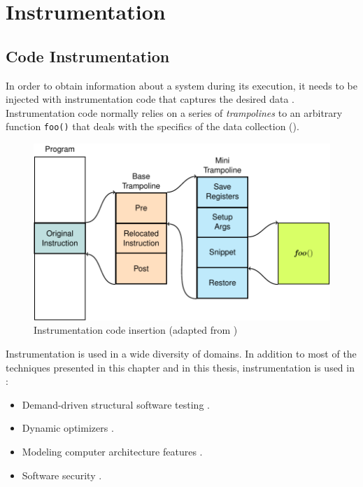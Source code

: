 \section{Instrumentation}
\subsection*{Code Instrumentation}
In order to obtain information about a system during its execution, it
needs to be injected with instrumentation code that captures the
desired data \citep{Garlan95}.
%
Instrumentation code normally relies on a series of \emph{trampolines}
to an arbitrary function \texttt{foo()} that deals with the specifics
of the data collection
().
%


\begin{figure}[ht]
  \includegraphics[width=0.9\columnwidth,page=1]{figures/related_work/figures/main.pdf}
  \caption{Instrumentation code insertion (adapted from \citep{Tikir02})}
  \label{fig:related-work:instrumentation-program}
\end{figure}


Instrumentation is used in a wide diversity of domains.
%
In addition to most of the techniques presented in this chapter and in
this thesis, instrumentation is used in \citep{Kumar05}:
\begin{itemize}[nolistsep]
\item Demand-driven structural software testing \citep{Misurda05}.
\item Dynamic optimizers \citep{Arnold01,Hong15,Bala00}.
\item Modeling computer architecture features \citep{Cmelik95,Scott03,Witchel96}.
\item Software security \citep{Kiriansky02,Scott02,Song08}.
\end{itemize}

